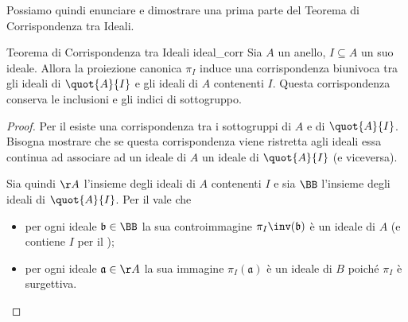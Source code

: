 Possiamo quindi enunciare e dimostrare una prima parte del Teorema di Corrispondenza tra Ideali.

\begin{theorem}
    {Teorema di Corrispondenza tra Ideali}
    {ideal_corr}
    Sia $A$ un anello, $I \subseteq A$ un suo ideale. Allora la proiezione canonica $\pi_I$ induce una corrispondenza biunivoca tra gli ideali di $\quot{A}{I}$ e gli ideali di $A$ contenenti $I$. Questa corrispondenza conserva le inclusioni e gli indici di sottogruppo.
\end{theorem}
\begin{proof}
    Per il  esiste una corrispondenza tra i sottogruppi di $A$ e di $\quot{A}{I}$. Bisogna mostrare che se questa corrispondenza viene ristretta agli ideali essa continua ad associare ad un ideale di $A$ un ideale di $\quot{A}{I}$ (e viceversa).

    Sia quindi $\AA$ l'insieme degli ideali di $A$ contenenti $I$ e sia $\BB$ l'insieme degli ideali di $\quot{A}{I}$. Per il  vale che \begin{itemize}
        \item per ogni ideale $\mathfrak{b} \in \BB$ la sua controimmagine $\pi_I\inv(\mathfrak{b})$ è un ideale di $A$ (e contiene $I$ per il );
        \item per ogni ideale $\mathfrak{a} \in \AA$ la sua immagine $\pi_I(\mathfrak{a})$ è un ideale di $B$ poiché $\pi_I$ è surgettiva. \qedhere
    \end{itemize}
\end{proof}